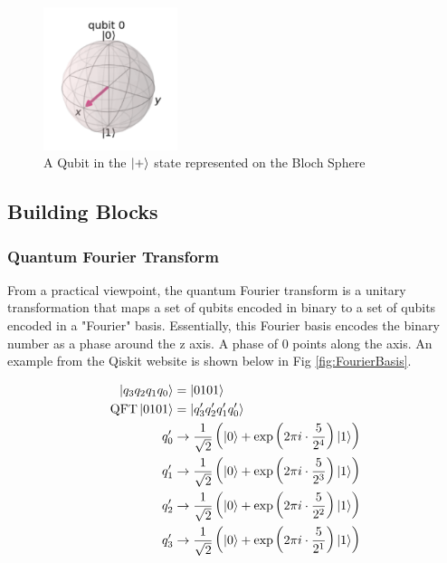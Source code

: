 \documentclass[journal]{IEEEtran}
\begin{document}
\begin{figure}[H]
    \begin{center}
        \includegraphics[width=0.35\textwidth]{BlochSphere.png}
        \caption{\label{fig:BlochSphere} A Qubit in the \(\ket{+}\) state represented on the Bloch Sphere}
    \end{center}
\end{figure}

\subsection{Building Blocks}
\subsubsection{Quantum Fourier Transform}

From a practical viewpoint, the quantum Fourier transform is a unitary
transformation that maps a set of qubits encoded in binary to a set of qubits
encoded in a "Fourier" basis. Essentially, this Fourier basis encodes the binary
number as a phase around the z axis. A phase of 0 points along the axis. An
example from the Qiskit website is shown below in Fig \ref{fig:FourierBasis}.


\begin{align*}
    \ket{q_{3} q_{2} q_{1} q_{0}} & =\ket{0101}                                                                                              \\
    \operatorname{QFT}\ket{0101}  & =\ket{q_{3} 'q_{2} 'q_{1} 'q_{0} '}                                                                      \\
    q_{0} '                       & \rightarrow \frac{1}{\sqrt{2}}\left(\ket{0} +\exp\left( 2\pi i\cdot \frac{5}{2^{4}}\right)\ket{1}\right) \\
    q_{1} '                       & \rightarrow \frac{1}{\sqrt{2}}\left(\ket{0} +\exp\left( 2\pi i\cdot \frac{5}{2^{3}}\right)\ket{1}\right) \\
    q_{2} '                       & \rightarrow \frac{1}{\sqrt{2}}\left(\ket{0} +\exp\left( 2\pi i\cdot \frac{5}{2^{2}}\right)\ket{1}\right) \\
    q_{3} '                       & \rightarrow \frac{1}{\sqrt{2}}\left(\ket{0} +\exp\left( 2\pi i\cdot \frac{5}{2^{1}}\right)\ket{1}\right)
\end{align*}
\end{document}
